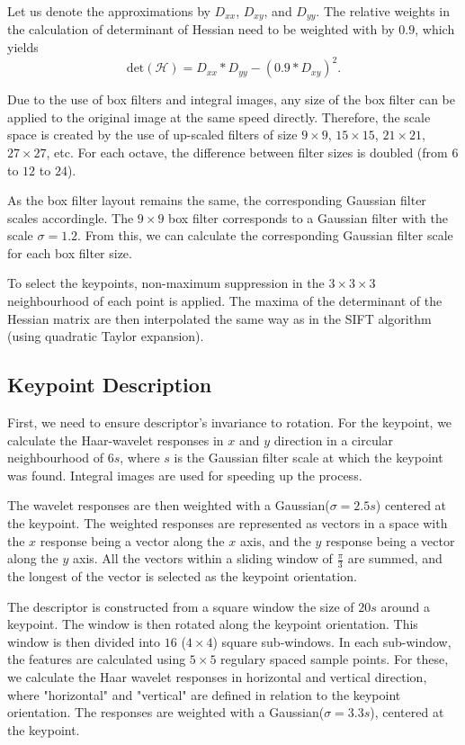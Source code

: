 Let us denote the approximations by $D_{xx}$, $D_{xy}$, and $D_{yy}$. The relative weights in the calculation of determinant of Hessian need to be weighted with by $0.9$, which yields
\begin{equation}
    \text{det}(\mathcal{H}) = D_{xx} * D_{yy} - (0.9 * D_{xy})^{2}.
\end{equation}

Due to the use of box filters and integral images, any size of the box filter can be applied to the original image at the same speed directly. Therefore, the scale space is created by the use of up-scaled filters of size $9\times9$, $15\times15$, $21\times21$, $27\times27$, etc. For each octave, the difference between filter sizes is doubled (from $6$ to $12$ to $24$).

As the box filter layout remains the same, the corresponding Gaussian filter scales accordingle. The $9\times9$ box filter corresponds to a Gaussian filter with the scale $\sigma = 1.2$. From this, we can calculate the corresponding Gaussian filter scale for each box filter size.

To select the keypoints, non-maximum suppression in the $3\times3\times3$ neighbourhood of each point is applied. The maxima of the determinant of the Hessian matrix are then interpolated the same way as in the SIFT algorithm (using quadratic Taylor expansion).

\subsection{Keypoint Description}
First, we need to ensure descriptor's invariance to rotation. For the keypoint, we calculate the Haar-wavelet responses in $x$ and $y$ direction in a circular neighbourhood of $6s$, where $s$ is the Gaussian filter scale at which the keypoint was found. Integral images are used for speeding up the process.

The wavelet responses are then weighted with a Gaussian($\sigma = 2.5 s$) centered at the keypoint. The weighted responses are represented as vectors in a space with the $x$ response being a vector along the $x$ axis, and the $y$ response being a vector along the $y$ axis. All the vectors within a sliding window of $\frac{\pi}{3}$ are summed, and the longest of the vector is selected as the keypoint orientation.

The descriptor is constructed from a square window the size of $20s$ around a keypoint. The window is then rotated along the keypoint orientation. This window is then divided into $16$ ($4\times4$) square sub-windows. In each sub-window, the features are calculated using $5\times5$ regulary spaced sample points. For these, we calculate the Haar wavelet responses in horizontal and vertical direction, where "horizontal" and "vertical" are defined in relation to the keypoint orientation. The responses are weighted with a Gaussian($\sigma = 3.3s$), centered at the keypoint.

